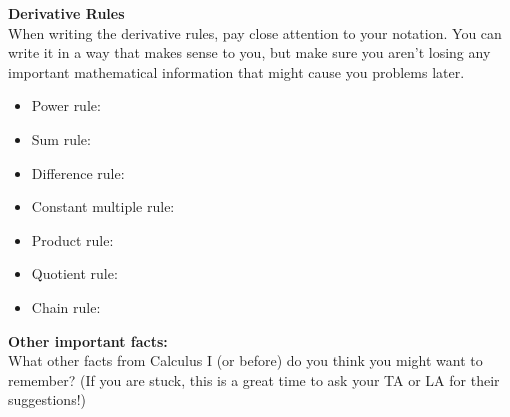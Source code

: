 \documentclass{ximera}
\begin{document}
\begin{exercise}
    \textbf{Derivative Rules} \\
    When writing the derivative rules, pay close attention to your notation.  You can write it in a way that makes sense to you, but make sure you aren't losing any important mathematical information that might cause you problems later.
    \begin{itemize}
        \item Power rule:
        \item Sum rule:
        \item Difference rule:
        \item Constant multiple rule:
        \item Product rule:
        \item Quotient rule:
        \item Chain rule:
    \end{itemize}
\end{exercise}

\begin{exercise}
    \textbf{Other important facts:}\\
    What other facts from Calculus I (or before) do you think you might want to remember?  (If you are stuck, this is a great time to ask your TA or LA for their suggestions!)
\end{exercise}
\end{document}
